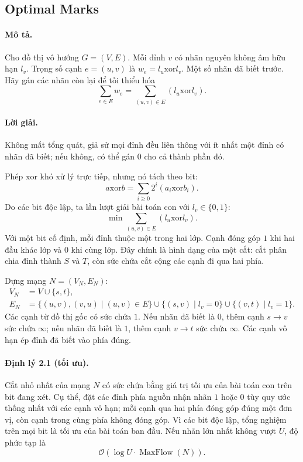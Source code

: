 \documentclass[11pt]{article}
\newcommand{\Oh}{\mathcal{O}}
\newcommand{\INF}{\infty}
\newcommand{\xor}{\mathbin{\mathrm{xor}}}
\begin{document}
\subsection{Optimal Marks}

\paragraph{Mô tả.}
Cho đồ thị vô hướng \(G=(V,E)\). Mỗi đỉnh \(v\) có nhãn nguyên không âm hữu
hạn \(l_v\). Trọng số cạnh \(e=(u,v)\) là \(w_e=l_u\xor l_v\). Một số nhãn
đã biết trước. Hãy gán các nhãn còn lại để tối thiểu hóa
\[
  \sum_{e\in E} w_e
  =\sum_{(u,v)\in E}(l_u\xor l_v). \tag{2.2}
\]

\paragraph{Lời giải.}
Không mất tổng quát, giả sử mọi đỉnh đều liên thông với ít nhất một đỉnh có
nhãn đã biết; nếu không, có thể gán \(0\) cho cả thành phần đó.

Phép \(\xor\) khó xử lý trực tiếp, nhưng nó tách theo bit:
\[
  a\xor b=\sum_{i\ge 0}2^i(a_i\xor b_i).
\]
Do các bit độc lập, ta lần lượt giải bài toán con với \(l_v\in\{0,1\}\):
\[
  \min \sum_{(u,v)\in E}(l_u\xor l_v).
\]
Với một bit cố định, mỗi đỉnh thuộc một trong hai lớp. Cạnh đóng góp \(1\)
khi hai đầu khác lớp và \(0\) khi cùng lớp. Đây chính là hình dạng của một
cắt: cắt phân chia đỉnh thành \(S\) và \(T\), còn sức chứa cắt cộng các cạnh
đi qua hai phía.

Dựng mạng \(N=(V_N,E_N)\):
\[
\begin{aligned}
V_N&=V\cup\{s,t\},\\
E_N&=\{(u,v),(v,u)\mid (u,v)\in E\}
      \cup\{(s,v)\mid l_v=0\}
      \cup\{(v,t)\mid l_v=1\}.
\end{aligned}
\]
Các cạnh từ đồ thị gốc có sức chứa \(1\). Nếu nhãn đã biết là \(0\), thêm
cạnh \(s\to v\) sức chứa \(\INF\); nếu nhãn đã biết là \(1\), thêm cạnh
\(v\to t\) sức chứa \(\INF\). Các cạnh vô hạn ép đỉnh đã biết vào phía đúng.

\paragraph{Định lý 2.1 (tối ưu).}
Cắt nhỏ nhất của mạng \(N\) có sức chứa bằng giá trị tối ưu của bài toán con
trên bit đang xét. Cụ thể, đặt các đỉnh phía nguồn nhận nhãn \(1\) hoặc \(0\)
tùy quy ước thống nhất với các cạnh vô hạn; mỗi cạnh qua hai phía đóng góp
đúng một đơn vị, còn cạnh trong cùng phía không đóng góp. Vì các bit độc lập,
tổng nghiệm trên mọi bit là tối ưu của bài toán ban đầu. Nếu nhãn lớn nhất
không vượt \(U\), độ phức tạp là
\[
  \Oh(\log U\cdot \operatorname{MaxFlow}(N)).
\]
\end{document}
